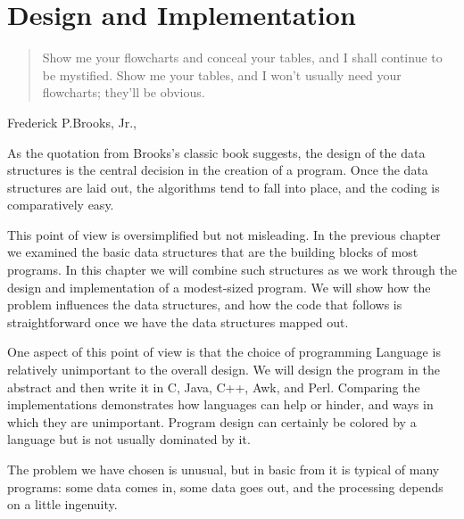 \chapter{Design and Implementation}
\label{chap:desipl}
\begin{quote}
    Show me your flowcharts and conceal your tables, and I shall continue
    to be mystified. Show me your tables, and I won't usually need your
    flowcharts; they'll be obvious.
\end{quote}

\begin{quotesrc}
    Frederick P.Brooks, Jr.,
\end{quotesrc}

As the quotation from Brooks's classic book suggests, the design of the
data structures is the central decision in the creation of a program. Once
the data structures are laid out, the algorithms tend to fall into place,
and the coding is comparatively easy.

This point of view is oversimplified but not misleading. In the previous
chapter we examined the basic data structures that are the building blocks
of most programs. In this chapter we will combine such structures as we
work through the design and implementation of a modest-sized program. We
will show how the problem influences the data structures, and how the code
that follows is straightforward once we have the data structures mapped out.

One aspect of this point of view is that the choice of programming Language
is relatively unimportant to the overall design. We will design the
program in the abstract and then write it in C, Java, C++, Awk, and Perl.
Comparing the implementations demonstrates how languages can help or
hinder, and ways in which they are unimportant. Program design can
certainly be colored by a language but is not usually dominated by it.

The problem we have chosen is unusual, but in basic from it is typical of
many programs: some data comes in, some data goes out, and the processing
depends on a little ingenuity.

